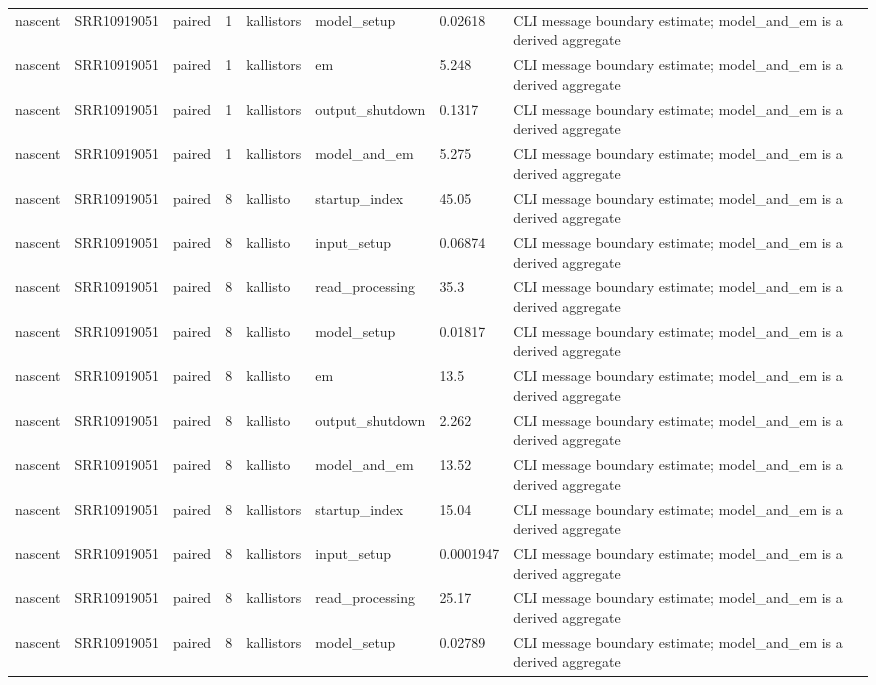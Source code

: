 \begin{tabular}{llllllll}
nascent & SRR10919051 & paired & 1 & kallistors & model\_setup & 0.02618 & CLI message boundary estimate; model\_and\_em is a derived aggregate \\
nascent & SRR10919051 & paired & 1 & kallistors & em & 5.248 & CLI message boundary estimate; model\_and\_em is a derived aggregate \\
nascent & SRR10919051 & paired & 1 & kallistors & output\_shutdown & 0.1317 & CLI message boundary estimate; model\_and\_em is a derived aggregate \\
nascent & SRR10919051 & paired & 1 & kallistors & model\_and\_em & 5.275 & CLI message boundary estimate; model\_and\_em is a derived aggregate \\
nascent & SRR10919051 & paired & 8 & kallisto & startup\_index & 45.05 & CLI message boundary estimate; model\_and\_em is a derived aggregate \\
nascent & SRR10919051 & paired & 8 & kallisto & input\_setup & 0.06874 & CLI message boundary estimate; model\_and\_em is a derived aggregate \\
nascent & SRR10919051 & paired & 8 & kallisto & read\_processing & 35.3 & CLI message boundary estimate; model\_and\_em is a derived aggregate \\
nascent & SRR10919051 & paired & 8 & kallisto & model\_setup & 0.01817 & CLI message boundary estimate; model\_and\_em is a derived aggregate \\
nascent & SRR10919051 & paired & 8 & kallisto & em & 13.5 & CLI message boundary estimate; model\_and\_em is a derived aggregate \\
nascent & SRR10919051 & paired & 8 & kallisto & output\_shutdown & 2.262 & CLI message boundary estimate; model\_and\_em is a derived aggregate \\
nascent & SRR10919051 & paired & 8 & kallisto & model\_and\_em & 13.52 & CLI message boundary estimate; model\_and\_em is a derived aggregate \\
nascent & SRR10919051 & paired & 8 & kallistors & startup\_index & 15.04 & CLI message boundary estimate; model\_and\_em is a derived aggregate \\
nascent & SRR10919051 & paired & 8 & kallistors & input\_setup & 0.0001947 & CLI message boundary estimate; model\_and\_em is a derived aggregate \\
nascent & SRR10919051 & paired & 8 & kallistors & read\_processing & 25.17 & CLI message boundary estimate; model\_and\_em is a derived aggregate \\
nascent & SRR10919051 & paired & 8 & kallistors & model\_setup & 0.02789 & CLI message boundary estimate; model\_and\_em is a derived aggregate \\

\end{tabular}
